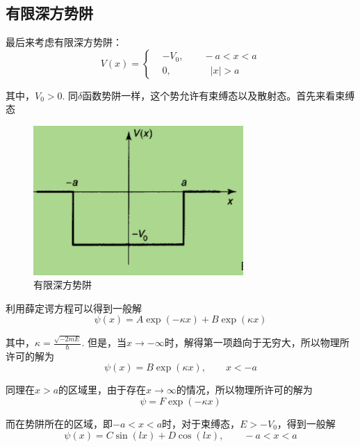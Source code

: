 \documentclass[UTF8]{ctexart}
\begin{document}
    \subsection{有限深方势阱}
    最后来考虑有限深方势阱：
    \begin{equation}
        V(x) = \left \{ \begin{aligned}
            &-V_0, \qquad -a<x<a \\
            &0,\qquad \qquad |x|>a
        \end{aligned} \right.
    \end{equation}

    其中，$V_0>0$. 同$\delta$函数势阱一样，这个势允许有束缚态以及散射态。首先来看束缚态
    \begin{figure}[htb]
        \centering
        \includegraphics[width=8cm]{figure2-3.png}
        \caption{有限深方势阱}
        \label{figure2.3}
    \end{figure}

    利用薛定谔方程可以得到一般解
    \begin{equation}
        \psi(x) =A \exp(-\kappa x) + B \exp(\kappa x) 
    \end{equation}

\noindent 其中，$\kappa = \frac{\sqrt{-2mE}}{\hbar}$. 但是，当$x \to - \infty$时，解得第一项趋向于无穷大，所以物理所许可的解为
\begin{equation}
    \psi(x) = B \exp(\kappa x), \qquad x<-a
\end{equation}

    同理在$x>a$的区域里，由于存在$x \to \infty$的情况，所以物理所许可的解为
    \begin{equation}
        \psi = F \exp(-\kappa x)
    \end{equation}

    而在势阱所在的区域，即$-a < x < a$时，对于束缚态，$E> - V_0$，得到一般解
    \begin{equation}
        \psi(x) = C \sin(lx) + D \cos(lx), \qquad -a <x <a
    \end{equation}
\end{document}
